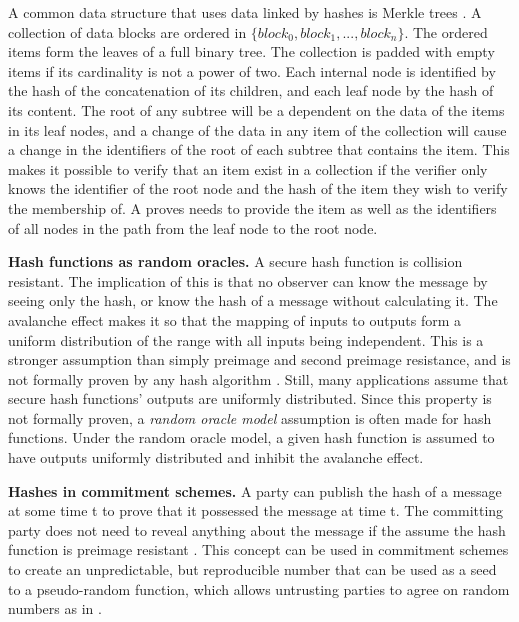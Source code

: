 A common data structure that uses data linked by hashes is Merkle trees \cite{merkle_digital_1988}. A collection of data blocks are ordered in $\{block_0, block_1, ..., block_n\}$. The ordered items form the leaves of a full binary tree. The collection is padded with empty items if its cardinality is not a power of two. Each internal node is identified by the hash of the concatenation of its children, and each leaf node by the hash of its content. The root of any subtree will be a dependent on the data of the items in its leaf nodes, and a change of the data in any item of the collection will cause a change in the identifiers of the root of each subtree that contains the item. 
This makes it possible to verify that an item exist in a collection if the verifier only knows the identifier of the root node and the hash of the item they wish to verify the membership of. A proves needs to provide the item as well as the identifiers of all nodes in the path from the leaf node to the root node. 

{\bf Hash functions as random oracles.}
A secure hash function is collision resistant. The implication of this is that no observer can know the message by seeing only the hash, or know the hash of a message without calculating it. The avalanche effect makes it so that the mapping of inputs to outputs form a uniform distribution of the range with all inputs being independent. This is a stronger assumption than simply preimage and second preimage resistance, and is not formally proven by any hash algorithm \cite[p.~179-181]{lindell2014introduction}. Still, many applications assume that secure hash functions' outputs are uniformly distributed. Since this property is not formally proven, a \emph{random oracle model} assumption is often made for hash functions. Under the random oracle model, a given hash function is assumed to have outputs uniformly distributed and inhibit the avalanche effect.

{\bf Hashes in commitment schemes.}
A party can publish the hash of a message at some time t to prove that it possessed the message at time t. The committing party does not need to reveal anything about the message if the assume the hash function is preimage resistant \cite[p.~187--189]{lindell2014introduction}. This concept can be used in commitment schemes \cite{brassard1988minimum} to create an unpredictable, but reproducible number that can be used as a seed to a pseudo-random function, which allows untrusting parties to agree on random numbers as in \cite{blum1983coin}.

